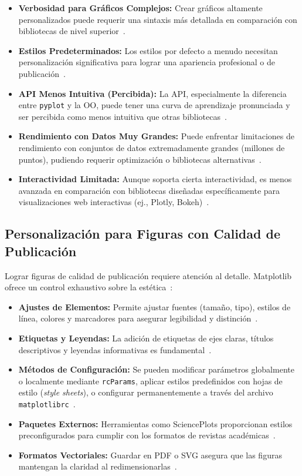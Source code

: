 \begin{itemize}
    \item \textbf{Verbosidad para Gráficos Complejos:} Crear gráficos altamente personalizados puede requerir una sintaxis más detallada en comparación con bibliotecas de nivel superior~\cite{Vu2023}.
    \item \textbf{Estilos Predeterminados:} Los estilos por defecto a menudo necesitan personalización significativa para lograr una apariencia profesional o de publicación~\cite{desosa2021, EHT2019}.
    \item \textbf{API Menos Intuitiva (Percibida):} La API, especialmente la diferencia entre \texttt{pyplot} y la OO, puede tener una curva de aprendizaje pronunciada y ser percibida como menos intuitiva que otras bibliotecas~\cite{RedditBioinfoMatplotlibSucks, RedditPythonMPLBad}.
    \item \textbf{Rendimiento con Datos Muy Grandes:} Puede enfrentar limitaciones de rendimiento con conjuntos de datos extremadamente grandes (millones de puntos), pudiendo requerir optimización o bibliotecas alternativas~\cite{StackOverflowGnuplotMPL}.
    \item \textbf{Interactividad Limitada:} Aunque soporta cierta interactividad, es menos avanzada en comparación con bibliotecas diseñadas específicamente para visualizaciones web interactivas (ej., Plotly, Bokeh)~\cite{GeeksforGeeksIntroMPL}.
\end{itemize}

\subsection{Personalización para Figuras con Calidad de Publicación}%
\label{subsec:personalizacion_publicacion}

Lograr figuras de calidad de publicación requiere atención al detalle. Matplotlib ofrece un control exhaustivo sobre la estética~\cite{Vu2023}:
\begin{itemize}
    \item \textbf{Ajustes de Elementos:} Permite ajustar fuentes (tamaño, tipo), estilos de línea, colores y marcadores para asegurar legibilidad y distinción~\cite{Zhauniarovich2022}.
    \item \textbf{Etiquetas y Leyendas:} La adición de etiquetas de ejes claras, títulos descriptivos y leyendas informativas es fundamental~\cite{GeeksforGeeksDataVis}.
    \item \textbf{Métodos de Configuración:} Se pueden modificar parámetros globalmente o localmente mediante \texttt{rcParams}, aplicar estilos predefinidos con hojas de estilo (\textit{style sheets}), o configurar permanentemente a través del archivo \texttt{matplotlibrc}~\cite{MatplotlibDevTeamCustomizing}.
    \item \textbf{Paquetes Externos:} Herramientas como SciencePlots proporcionan estilos preconfigurados para cumplir con los formatos de revistas académicas~\cite{GarrettSciencePlots}.
    \item \textbf{Formatos Vectoriales:} Guardar en PDF o SVG asegura que las figuras mantengan la claridad al redimensionarlas~\cite{Zhauniarovich2022}.
\end{itemize}